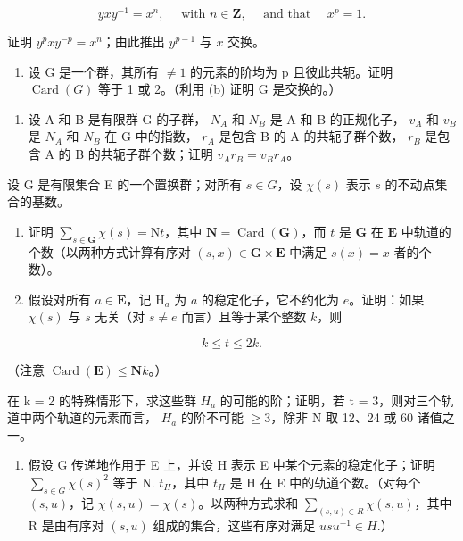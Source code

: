 \[
y x y ^ {- 1} = x ^ {n}, \quad \text { with } n \in \mathbf {Z}, \quad \text { and   that } \quad x ^ {p} = 1.
\]

证明 \(y^{p}xy^{-p} = x^{n}\)；由此推出 \(y^{p - 1}\) 与 \(x\) 交换。

\begin{enumerate}
\def\labelenumi{(\alph{enumi})}
\setcounter{enumi}{2}
\tightlist
\item
  设 G 是一个群，其所有 \(\neq1\) 的元素的阶均为 p 且彼此共轭。证明 \(\operatorname{Card}(G)\) 等于 1 或 2。（利用 (b) 证明 G 是交换的。）
\end{enumerate}

\begin{enumerate}
\def\labelenumi{\arabic{enumi}。}
\setcounter{enumi}{7}
\tightlist
\item
  设 A 和 B 是有限群 G 的子群， \(N_{A}\) 和 \(N_{B}\) 是 A 和 B 的正规化子， \(v_{A}\) 和 \(v_{B}\) 是 \(N_{A}\) 和 \(N_{B}\) 在 G 中的指数， \(r_{A}\) 是包含 B 的 A 的共轭子群个数， \(r_{B}\) 是包含 A 的 B 的共轭子群个数；证明 \(v_{A}r_{B} = v_{B}r_{A}\)。
\end{enumerate}

设 G 是有限集合 E 的一个置换群；对所有 \(s \in G\)，设 \(\chi(s)\) 表示 \(s\) 的不动点集合的基数。

\begin{enumerate}
\def\labelenumi{(\alph{enumi})}
\item
  证明 \(\sum_{s\in \mathbf{G}}\chi (s) = \mathrm{N}t\)，其中 \(\mathbf{N} = \operatorname {Card}(\mathbf{G})\)，而 \(t\) 是 \(\mathbf{G}\) 在 \(\mathbf{E}\) 中轨道的个数（以两种方式计算有序对 \((s,x)\in \mathbf{G}\times \mathbf{E}\) 中满足 \(s(x) = x\) 者的个数）。
\item
  假设对所有 \(a \in \mathbf{E}\)，记 \(\mathrm{H}_a\) 为 \(a\) 的稳定化子，它不约化为 \(e\)。证明：如果 \(\chi(s)\) 与 \(s\) 无关（对 \(s \neq e\) 而言）且等于某个整数 \(k\)，则
\end{enumerate}

\[
k \leqslant t \leqslant 2 k.
\]

（注意 \(\operatorname{Card}(\mathbf{E}) \leqslant \mathbf{N}k\)。）

在 k = 2 的特殊情形下，求这些群 \(H_{a}\) 的可能的阶；证明，若 t = 3，则对三个轨道中两个轨道的元素而言， \(H_{a}\) 的阶不可能 \(\geqslant 3\)，除非 N 取 12、24 或 60 诸值之一。

\begin{enumerate}
\def\labelenumi{(\alph{enumi})}
\setcounter{enumi}{2}
\tightlist
\item
  假设 G 传递地作用于 E 上，并设 H 表示 E 中某个元素的稳定化子；证明 \(\sum_{s\in G}\chi(s)^{2}\) 等于 N. \(t_{H}\)，其中 \(t_{H}\) 是 H 在 E 中的轨道个数。（对每个 \((s,u)\)，记 \(\chi(s,u)=\chi(s)\)。以两种方式求和 \(\sum_{(s,u)\in R}\chi(s,u)\)，其中 R 是由有序对 \((s,u)\) 组成的集合，这些有序对满足 \(usu^{-1}\in H.\)）
\end{enumerate}

